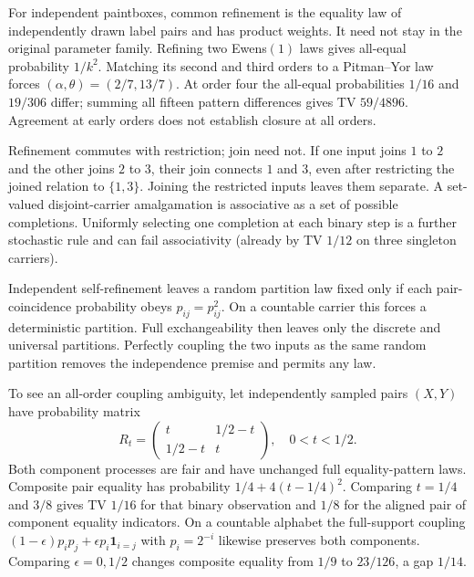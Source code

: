 For independent paintboxes, common refinement is the equality law of independently drawn label pairs and has product weights. It need not stay in the original parameter family. Refining two Ewens$(1)$ laws gives all-equal probability $1/k^2$. Matching its second and third orders to a Pitman--Yor law forces $(\alpha,\theta)=(2/7,13/7)$. At order four the all-equal probabilities $1/16$ and $19/306$ differ; summing all fifteen pattern differences gives TV $59/4896$. Agreement at early orders does not establish closure at all orders.

Refinement commutes with restriction; join need not. If one input joins $1$ to $2$ and the other joins $2$ to $3$, their join connects $1$ and $3$, even after restricting the joined relation to $\{1,3\}$. Joining the restricted inputs leaves them separate. A set-valued disjoint-carrier amalgamation is associative as a set of possible completions. Uniformly selecting one completion at each binary step is a further stochastic rule and can fail associativity (already by TV $1/12$ on three singleton carriers).

Independent self-refinement leaves a random partition law fixed only if each pair-coincidence probability obeys $p_{ij}=p_{ij}^2$. On a countable carrier this forces a deterministic partition. Full exchangeability then leaves only the discrete and universal partitions. Perfectly coupling the two inputs as the same random partition removes the independence premise and permits any law.

To see an all-order coupling ambiguity, let independently sampled pairs $(X,Y)$ have probability matrix
\[
 R_t=\begin{pmatrix}t&1/2-t\\1/2-t&t\end{pmatrix},\quad0<t<1/2.
\]
Both component processes are fair and have unchanged full equality-pattern laws. Composite pair equality has probability $1/4+4(t-1/4)^2$. Comparing $t=1/4$ and $3/8$ gives TV $1/16$ for that binary observation and $1/8$ for the aligned pair of component equality indicators. On a countable alphabet the full-support coupling
$(1-\epsilon)p_ip_j+\epsilon p_i\mathbf1_{i=j}$ with $p_i=2^{-i}$ likewise preserves both components. Comparing $\epsilon=0,1/2$ changes composite equality from $1/9$ to $23/126$, a gap $1/14$.

